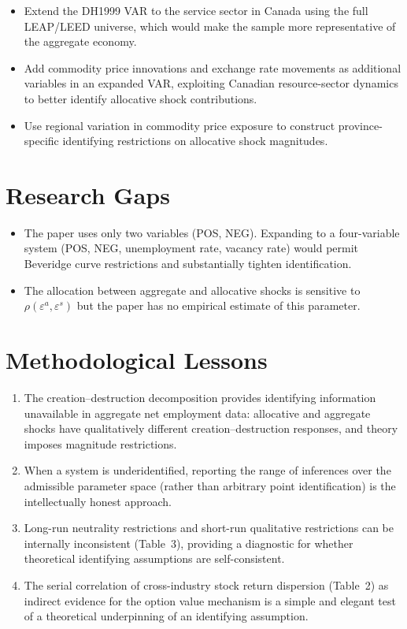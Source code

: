 \begin{itemize}
  \item Extend the DH1999 VAR to the service sector in Canada using the full
    LEAP/LEED universe, which would make the sample more representative of
    the aggregate economy.
  \item Add commodity price innovations and exchange rate movements as
    additional variables in an expanded VAR, exploiting Canadian resource-sector
    dynamics to better identify allocative shock contributions.
  \item Use regional variation in commodity price exposure to construct
    province-specific identifying restrictions on allocative shock magnitudes.
\end{itemize}

\section{Research Gaps}

\begin{itemize}
  \item The paper uses only two variables (POS, NEG). Expanding to a
    four-variable system (POS, NEG, unemployment rate, vacancy rate) would
    permit Beveridge curve restrictions and substantially tighten identification.
  \item The allocation between aggregate and allocative shocks is sensitive to
    $\rho(\varepsilon^a,\varepsilon^s)$ but the paper has no empirical estimate
    of this parameter.
\end{itemize}

\section{Methodological Lessons}

\begin{enumerate}
  \item The creation--destruction decomposition provides identifying information
    unavailable in aggregate net employment data: allocative and aggregate
    shocks have qualitatively different creation--destruction responses, and
    theory imposes magnitude restrictions.
  \item When a system is underidentified, reporting the range of inferences
    over the admissible parameter space (rather than arbitrary point
    identification) is the intellectually honest approach.
  \item Long-run neutrality restrictions and short-run qualitative restrictions
    can be internally inconsistent (Table~3), providing a diagnostic for
    whether theoretical identifying assumptions are self-consistent.
  \item The serial correlation of cross-industry stock return dispersion
    (Table~2) as indirect evidence for the option value mechanism is a simple
    and elegant test of a theoretical underpinning of an identifying assumption.
\end{enumerate}

